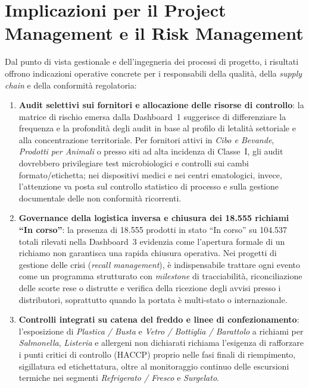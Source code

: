 \section{Implicazioni per il Project Management e il Risk Management}
Dal punto di vista gestionale e dell'ingegneria dei processi di progetto, i risultati offrono indicazioni operative concrete per i responsabili della qualità, della \textit{supply chain} e della conformità regolatoria:
\begin{enumerate}
    \item \textbf{Audit selettivi sui fornitori e allocazione delle risorse di controllo}: la matrice di rischio emersa dalla Dashboard~1 suggerisce di differenziare la frequenza e la profondità degli audit in base al profilo di letalità settoriale e alla concentrazione territoriale. Per fornitori attivi in \textit{Cibo e Bevande}, \textit{Prodotti per Animali} o presso siti ad alta incidenza di Classe~I, gli audit dovrebbero privilegiare test microbiologici e controlli sui cambi formato/etichetta; nei dispositivi medici e nei centri ematologici, invece, l'attenzione va posta sul controllo statistico di processo e sulla gestione documentale delle non conformità ricorrenti.
    \item \textbf{Governance della logistica inversa e chiusura dei 18.555 richiami ``In corso''}: la presenza di 18.555 prodotti in stato ``In corso'' su 104.537 totali rilevati nella Dashboard~3 evidenzia come l'apertura formale di un richiamo non garantisca una rapida chiusura operativa. Nei progetti di gestione delle crisi (\textit{recall management}), è indispensabile trattare ogni evento come un programma strutturato con \textit{milestone} di tracciabilità, riconciliazione delle scorte rese o distrutte e verifica della ricezione degli avvisi presso i distributori, soprattutto quando la portata è multi-stato o internazionale.
    \item \textbf{Controlli integrati su catena del freddo e linee di confezionamento}: l'esposizione di \textit{Plastica / Busta} e \textit{Vetro / Bottiglia / Barattolo} a richiami per \textit{Salmonella}, \textit{Listeria} e allergeni non dichiarati richiama l'esigenza di rafforzare i punti critici di controllo (HACCP) proprio nelle fasi finali di riempimento, sigillatura ed etichettatura, oltre al monitoraggio continuo delle escursioni termiche nei segmenti \textit{Refrigerato / Fresco} e \textit{Surgelato}.
\end{enumerate}

